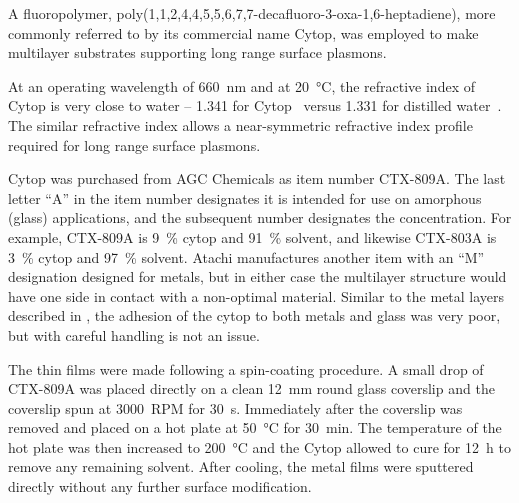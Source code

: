 A fluoropolymer, poly(1,1,2,4,4,5,5,6,7,7-decafluoro-3-oxa-1,6-heptadiene),
more commonly referred to by its commercial name Cytop, was employed to
make multilayer substrates supporting long range surface plasmons.

At an operating wavelength of \SI{660}{\nano\meter} and at
\SI{20}{\celsius}, the refractive index of Cytop is very close to water --
1.341 for Cytop~\cite{mikevs2005synthesis} versus 1.331 for distilled
water~\cite{andreasson1971measurement}.  The similar refractive index
allows a near-symmetric refractive index profile required for long range
surface plasmons.

Cytop was purchased from AGC Chemicals as item number CTX-809A.  The last
letter ``A'' in the item number designates it is intended for use on
amorphous (glass) applications, and the subsequent number designates the
concentration.  For example, CTX-809A is \SI{9}{\percent} cytop and
\SI{91}{\percent} solvent, and likewise CTX-803A is \SI{3}{\percent} cytop
and \SI{97}{\percent} solvent.  Atachi manufactures another item with an
``M'' designation designed for metals, but in either case the multilayer
structure would have one side in contact with a non-optimal material.
Similar to the metal layers described in , the
adhesion of the cytop to both metals and glass was very poor, but with
careful handling is not an issue.

The thin films were made following a spin-coating procedure.  A small drop
of CTX-809A was placed directly on a clean \SI{12}{\milli\meter} round
glass coverslip and the coverslip spun at \SI{3000}{RPM} for \SI{30}{\second}.
Immediately after the coverslip was removed and placed on a hot plate at
\SI{50}{\celsius} for \SI{30}{\minute}.  The temperature of the hot plate
was then increased to \SI{200}{\celsius} and the Cytop allowed to cure for
\SI{12}{\hour} to remove any remaining solvent.  After cooling, the metal
films were sputtered directly without any further surface modification.

